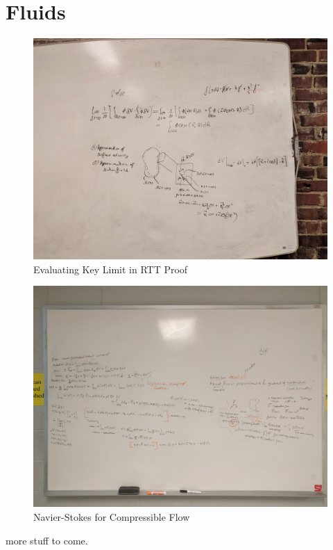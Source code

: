 \appendix

\chapter{Fluids}
\begin{figure}[h!]
    \centering
    \includegraphics[width=1.0\textwidth]{fig/RTT.jpg}
    \caption{Evaluating Key Limit in RTT Proof}
    \label{fig:rtt}
\end{figure}

\begin{figure}[h!]
    \centering
    \includegraphics[width=1.0\textwidth]{fig/NS.jpg}
    \caption{Navier-Stokes for Compressible Flow}
    \label{fig:ns}
\end{figure}
more stuff to come.